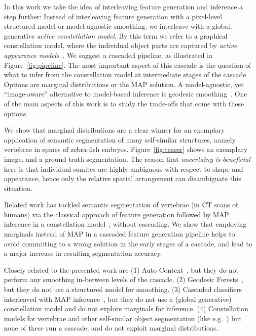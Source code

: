\documentclass[10pt,twocolumn,letterpaper]{article}
\begin{document}
In this work we take the idea of interleaving feature generation and inference a step further: 
%
Instead of interleaving feature generation with a pixel-level structured model or model-agnostic smoothing, we interleave with a global, generative \emph{active constellation model}. By this term we refer to a graphical constellation model, where the individual object parts are captured by \emph{active appearance models}~\cite{CootesAAM2001}. 
%
We suggest a cascaded pipeline, as illustrated in Figure~\ref{fig:pipeline}. 
% 
The most important aspect of this cascade is the question of what to infer from the constellation model at intermediate stages of the cascade. 
%
Options are marginal distributions or the MAP solution. A model-agnostic, yet ``image-aware'' alternative to model-based inference is geodesic smoothing~\cite{GeoForests2013}. 
%
One of the main aspects of this work is to study the trade-offs that come with these options. 

We show that marginal distributions are a clear winner for an exemplary application of semantic segmentation of many self-similar structures, namely vertebrae in spines of zebra-fish embryos. Figure~\ref{fig:teaser} shows an exemplary image, and a ground truth segmentation. 
%
The reason that \emph{uncertainy is beneficial} here is that individual somites are highly ambiguous with respect to shape and appearance, hence only the relative spatial arrangement can disambiguate this situation. 

Related work has tackled semantic segmentation of vertebrae (in CT scans of humans) via the classical approach of feature generation followed by MAP inference in a constellation model~\cite{Glocker2013}, without cascading. 
%
We show that employing marginals instead of MAP in a cascaded feature generation pipeline helps to avoid committing to a wrong solution in the early stages of a cascade, and lead to a major increase in resulting segmentation accuracy. 

Closely related to the presented work are 
(1) Auto Context~\cite{AutoContext2008}, but they do not perform any smoothing in-between levels of the cascade. 
(2) Geodesic Forests~\cite{GeoForests2013}, but they do not use a structured model for smoothing. 
(3) Cascaded classifiers interleaved with MAP inference~\cite{DTF,RTF,UweCVPR2013}, but they do not use a (global generative) constellation model and do not explore marginals for inference. 
(4) Constellation models for vertebrae and other self-similar object segmentation (like e.g.\ \cite{Glocker2012,Glocker2013,Klinder2009471,TeethMICCAI2012,WormMiccai2014}) but none of these run a cascade, and do not exploit marginal distributions. 
\end{document}
